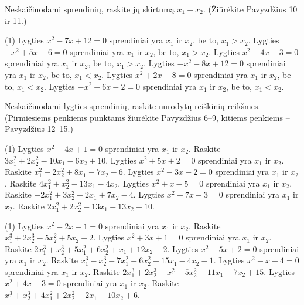\documentclass[11pt,a4paper]{scrartcl}
\begin{document}
\begin{problem}
Neskaičiuodami sprendinių, raskite jų skirtumą $x_1-x_2$.
(Žiūrėkite Pavyzdžius 10 ir 11.)

\begin{tasks}[label={(\arabic*)}, label-offset=0.9em, start=1](1)
    \task Lygties $x^2-7x+12=0$ sprendiniai yra $x_1$ ir $x_2$, be to, $x_1>x_2$.
    \task Lygties $-x^2+5x-6=0$ sprendiniai yra $x_1$ ir $x_2$, be to, $x_1>x_2$.
    \task Lygties $x^2-4x-3=0$ sprendiniai yra $x_1$ ir $x_2$, be to, $x_1>x_2$.
    \task Lygties $-x^2-8x+12=0$ sprendiniai yra $x_1$ ir $x_2$, be to, $x_1<x_2$.
    \task Lygties $x^2+2x-8=0$ sprendiniai yra $x_1$ ir $x_2$, be to, $x_1<x_2$.
    \task Lygties $-x^2-6x-2=0$ sprendiniai yra $x_1$ ir $x_2$, be to, $x_1<x_2$.
\end{tasks}
\end{problem}

\begin{problem}
Neskaičiuodami lygties sprendinių, raskite nurodytų reiškinių reikšmes.
(Pirmiesiems penkiems punktams žiūrėkite Pavyzdžius 6–9, kitiems penkiems – Pavyzdžius 12–15.)
\begin{tasks}[label={(\arabic*)}, label-offset=0.9em](1)
    \task Lygties $x^2-4x+1=0$ sprendiniai yra $x_1$ ir $x_2$. Raskite
    $3x_1^2+2x_2^2-10x_1-6x_2+10$.
    \task Lygties $x^2+5x+2=0$ sprendiniai yra $x_1$ ir $x_2$. Raskite
    $x_1^2-2x_2^2+8x_1-7x_2-6$.
    \task Lygties $x^2-3x-2=0$ sprendiniai yra $x_1$ ir $x_2$. Raskite
    $4x_1^2+x_2^2-13x_1-4x_2$.
    \task Lygties $x^2+x-5=0$ sprendiniai yra $x_1$ ir $x_2$. Raskite
    $-2x_1^2+3x_2^2+2x_1+7x_2-4$.
    \task Lygties $x^2-7x+3=0$ sprendiniai yra $x_1$ ir $x_2$. Raskite
    $2x_1^2+2x_2^2-13x_1-13x_2+10$.
\end{tasks}
\begin{tasks}[label={(\arabic*)}, label-offset=0.9em, resume](1)
    \task Lygties $x^2-2x-1=0$ sprendiniai yra $x_1$ ir $x_2$. Raskite
    $x_1^3+2x_2^3-5x_2^2+5x_2+2$.
    \task Lygties $x^2+3x+1=0$ sprendiniai yra $x_1$ ir $x_2$. Raskite
    $2x_1^3+x_2^3+5x_1^2+6x_2^2+x_1+12x_2-2$.
    \task Lygties $x^2-5x+2=0$ sprendiniai yra $x_1$ ir $x_2$. Raskite
    $x_1^3-x_2^3-7x_1^2+6x_2^2+15x_1-4x_2-1$.
    \task Lygties $x^2-x-4=0$ sprendiniai yra $x_1$ ir $x_2$. Raskite
    $2x_1^3+2x_2^3-x_1^2-5x_2^2-11x_1-7x_2+15$.
    \task Lygties $x^2+4x-3=0$ sprendiniai yra $x_1$ ir $x_2$. Raskite
    $x_1^3+x_2^3+4x_1^2+2x_2^2-2x_1-10x_2+6$.
\end{tasks}
\end{problem}
\end{document}

